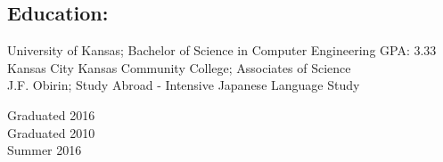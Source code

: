 \documentclass{res}
\begin{document}
\begin{resume}
\section{Education:}\vspace{5pt}
\begin{minipage}{0.8\linewidth}
	\begin{small}
		\begin{flushleft}
			University of Kansas; Bachelor of Science in Computer Engineering GPA: 3.33\\Kansas City Kansas Community College; Associates of Science\\J.F. Obirin; Study Abroad - Intensive Japanese Language Study
		\end{flushleft}
	\end{small}   
\end{minipage}
\begin{minipage}{0.2\linewidth}
	\begin{small}   
		\begin{flushright}
			Graduated 2016\\Graduated 2010\\Summer 2016
		\end{flushright}
	\end{small}   
\end{minipage}\vspace{-10pt}
 

\end{resume}
\end{document}
